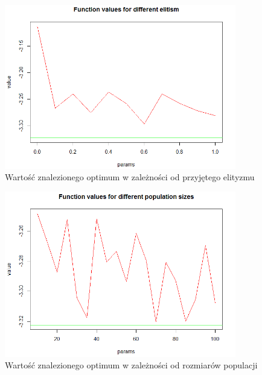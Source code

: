 \documentclass[11pt, a4paper]{article}
\begin{document}
\begin{figure}[H]
	\begin{center}
		\includegraphics[width=0.9\textwidth]{./assets/Hartman64.png} %
		\caption{Wartość znalezionego optimum w zależności od przyjętego elityzmu}
		\label{fig:hartman64}
	\end{center}
\end{figure}

\begin{figure}[H]
	\begin{center}
		\includegraphics[width=0.9\textwidth]{./assets/Hartman65.png} %
		\caption{Wartość znalezionego optimum w zależności od rozmiarów populacji}
		\label{fig:hartman65}
	\end{center}
\end{figure}
\end{document}
